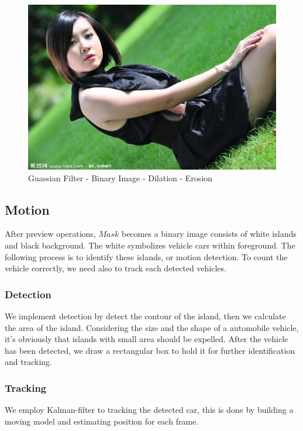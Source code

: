 \documentclass[conference]{IEEEtran}
\begin{document}
	\begin{figure}[!h]
	\centering
	\includegraphics[width=1\linewidth]{figures/jena.jpg} 
	\caption{Guassian Filter - Binary Image - Dilation - Erosion}
	\label{fig:preDetection}
	\end{figure}
			
	
	\subsection{Motion}
	After preview operations, $Mask$ becomes a binary image consists of white islands and black background. The white symbolizes vehicle cars within foreground. The following process is to identify these islands, or motion detection. To count the vehicle correctly, we need also to track each detected vehicles.
	
	\subsubsection{Detection}
	We implement detection by detect the contour of the island, then we calculate the area of the island. Considering the size and the shape of a automobile vehicle, it's obviously that islands with small area should be expelled. After the vehicle has been detected, we draw a rectangular box to hold it for further identification and tracking.
	
	
	\subsubsection{Tracking}
	We employ Kalman-filter to tracking the detected car, this is done by building a moving model and estimating position for each frame.	%
\end{document}
